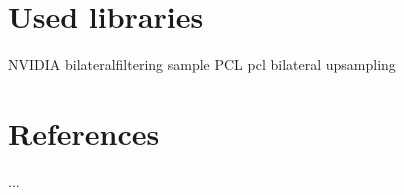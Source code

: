 \documentclass{ucl_thesis}
\begin{document}
%
%	

\section{Used libraries}
NVIDIA bilateralfiltering sample
PCL
 pcl bilateral upsampling
 \citep{DCBGridStereo}
 

\section{References}
	...
	
\citep{Lowe04}

%

	
\end{document}
